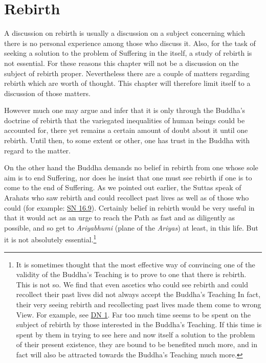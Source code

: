 \chapter{Rebirth}

A discussion on rebirth is usually a discussion on a subject concerning which there is no personal experience among those who discuss it. Also, for the task of seeking a solution to the  problem of Suffering in the  itself, a study of rebirth is not essential. For these reasons this chapter will not be a discussion on the subject of rebirth proper. Nevertheless there are a couple of matters regarding rebirth which are worth of thought. This chapter will therefore limit itself to a discussion of those matters.

However much one may argue and infer that it is only through the Buddha's doctrine of rebirth that the variegated inequalities of human beings could be accounted for, there yet remains a certain amount of doubt about it until one  rebirth. Until then, to some extent or other, one has trust in the Buddha with regard to the matter.

On the other hand the Buddha demands no belief in rebirth from one whose sole aim is to end Suffering, nor does he insist that one must see rebirth if one is to come to the end of Suffering. As we pointed out earlier, the Suttas speak of Arahats who saw rebirth and could recollect past lives as well as of those who could  (for example: \href{https://suttacentral.net/sn16.9/en/bodhi}{SN 16.9}). Certainly belief in rebirth would be very useful in that it would act as an urge to reach the Path as fast and as diligently as possible, and so get to \emph{Ariyabhumi} (plane of the \emph{Ariyas}) at least, in this life. But it is not absolutely essential.\footnote{It is sometimes thought that the most effective way of convincing one of the validity of the Buddha's Teaching is to prove to one that there is rebirth. This is not so. We find that even ascetics who could see rebirth and could recollect their past lives did not always accept the Buddha's Teaching In fact, their very seeing rebirth and recollecting past lives made them come to wrong View. For example, see \href{https://suttacentral.net/dn1/en/bodhi}{DN 1}. Far too much time seems to be spent on the subject of rebirth by those interested in the Buddha's Teaching. If this time is spent by them in trying to see here and now itself a solution to the problem of their present existence, they are bound to be benefited much more, and in fact will also be attracted towards the Buddha's Teaching much more.}

